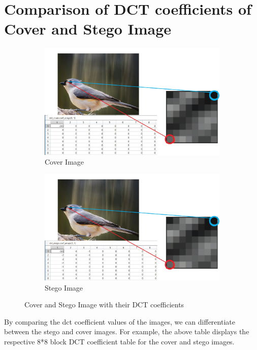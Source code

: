 \section{Comparison of DCT coefficients of Cover and Stego Image}
\begin{figure}[H]
    \centering
    \begin{subfigure}[b]{0.7\textwidth}
        \centering
        \includegraphics[width=\textwidth]{img/cover.jpg}
        \caption{Cover Image}
    \end{subfigure}
    \hfill
    \begin{subfigure}[b]{0.7\textwidth}
        \centering
        \includegraphics[width=\textwidth]{img/stego.jpg}
        \caption{Stego Image}
    \end{subfigure}
    \caption{Cover and Stego Image with their DCT coefficients}
\end{figure}
By comparing the dct coefficient values of the images, we can differentiate between the stego and cover images. For example, the above table displays the respective 8*8 block DCT coefficient table for the cover and stego images.\\
